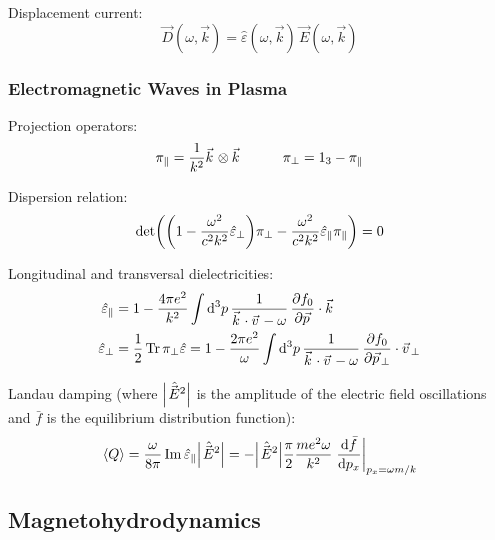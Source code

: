 			\noindent
			Displacement current:
			\begin{equation}
				\vec{D}(\omega,\vec{k})  = \hat{\varepsilon}(\omega, \vec{k}) \, \vec{E}(\omega, \vec{k})
			\end{equation}

		\subsubsection{Electromagnetic Waves in Plasma}
			Projection operators:
			\begin{equation}
				\pi_\parallel = \frac{1}{k^2}\vec{k}\otimes\vec{k}
				\hsp
				\pi_\perp = 1_3 - \pi_\parallel
			\end{equation}

			\noindent
			Dispersion relation:
			\begin{equation}
				\det(\qty(1 - \frac{\omega^2}{c^2 k^2}\hat{\varepsilon}_\perp) \pi_\perp - \frac{\omega^2}{c^2 k^2}\hat{\varepsilon}_\parallel \pi_\parallel) = 0
			\end{equation}

			\noindent
			Longitudinal and transversal dielectricities:
			\begin{equation}
				\begin{aligned}
					\hat{\varepsilon}_{\parallel} &= 1-\frac{4\pi e^{2}}{k^{2}}\int{\mathrm d^{3}}p\,\frac{1}{\vec{k}\cdot\vec{v}-\omega}\,\frac{\partial f_{0}}{\partial\vec{p}}\cdot\vec{k}\\
					\hat{\varepsilon}_{\perp} &= \frac{1}{2}\,\tr\,\pi_{\perp}\hat{\varepsilon}=1-\frac{2\pi e^{2}}{\omega}\int\mathrm{d}^{3}p\,\frac{1}{\vec{k}\cdot\vec{v}-\omega}\,\frac{\partial f_{0}}{\partial\vec{p}_{\perp}}\cdot\vec{v}_{\perp}
				\end{aligned}
			\end{equation}

			\noindent
			Landau damping (where $\abs{\hat{\vec{E}}^2}$ is the amplitude of the electric field oscillations and $\bar{f}$ is the equilibrium distribution function):
			\begin{equation}
				\avg{Q}
				= \frac{\omega}{8 \pi} \Im \hat{\varepsilon}_\parallel \abs{\hat{\vec{E}}^2}
				= - \abs{\hat{\vec{E}}^2} \frac{\pi}{2} \frac{m e^2 \omega}{k^2} \eval{\dv{\bar{f}}{p_x}}_{p_x = \omega m /k}
			\end{equation}

	\subsection{Magnetohydrodynamics}
